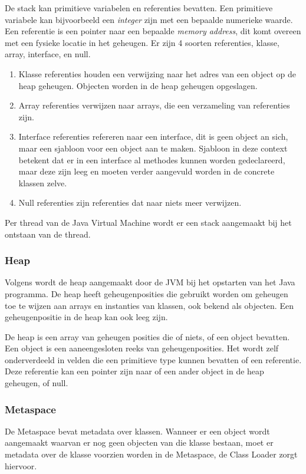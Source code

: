 De stack kan primitieve variabelen en referenties bevatten.
Een primitieve variabele kan bijvoorbeeld een \textit{integer} zijn met een bepaalde numerieke waarde.
Een referentie is een pointer naar een bepaalde \textit{memory address}, dit komt overeen met een fysieke locatie in het geheugen.\autocite{Huck1993}
Er zijn 4 soorten referenties, klasse, array, interface, en null.
\begin{enumerate}
    \item  Klasse referenties houden een verwijzing naar het adres van een object op de heap geheugen.
    Objecten worden in de heap geheugen opgeslagen.
    \item Array referenties verwijzen naar arrays, die een verzameling van referenties zijn.
    \item Interface referenties refereren naar een interface, dit is geen object an sich, maar een sjabloon voor een object aan te maken.
    Sjabloon in deze context betekent dat er in een interface al methodes kunnen worden gedeclareerd, maar deze zijn leeg en moeten verder aangevuld worden in de concrete klassen zelve.
    \item Null referenties zijn referenties dat naar niets meer verwijzen.
\end{enumerate}


Per thread van de Java Virtual Machine wordt er een stack aangemaakt bij het ontstaan van de thread.
\autocite{Lindholm2013}

\subsubsection{Heap}
\label{sec:heap}
Volgens \textcite{Grgic2018} wordt de heap aangemaakt door de JVM bij het opstarten van het Java programma.
De heap heeft geheugenposities die gebruikt worden om geheugen toe te wijzen aan arrays en instanties van klassen, ook bekend als objecten.
Een geheugenpositie in de heap kan ook leeg zijn.

De heap is een array van geheugen posities die of niets, of een object bevatten.
Een object is een aaneengesloten reeks van geheugenposities. Het wordt zelf onderverdeeld in velden die een primitieve type kunnen bevatten of een referentie.
Deze referentie kan een pointer zijn naar of een ander object in de heap geheugen, of null.\autocite{Bruno2018}
\subsubsection{Metaspace}
\label{sec:Metaspace}
De Metaspace bevat metadata over klassen.
Wanneer er een object wordt aangemaakt waarvan er nog geen objecten van die klasse bestaan, moet er metadata over de klasse voorzien worden in de Metaspace, de Class Loader zorgt hiervoor.


